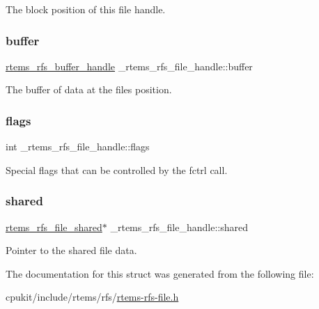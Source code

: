 The block position of this file handle. \mbox{\label{struct__rtems__rfs__file__handle_aaef16592d0b0c80d20b25affc231cc0f}} 
\subsubsection{\texorpdfstring{buffer}{buffer}}
{\footnotesize\ttfamily \mbox{\hyperlink{rtems-rfs-buffer_8h_a17f97c37c5273ad28d413dfd2d175e23}{rtems\+\_\+rfs\+\_\+buffer\+\_\+handle}} \+\_\+rtems\+\_\+rfs\+\_\+file\+\_\+handle\+::buffer}

The buffer of data at the file\textquotesingle{}s position. \mbox{\label{struct__rtems__rfs__file__handle_a445c19e3d76da08510851cf726ac1af5}} 
\subsubsection{\texorpdfstring{flags}{flags}}
{\footnotesize\ttfamily int \+\_\+rtems\+\_\+rfs\+\_\+file\+\_\+handle\+::flags}

Special flags that can be controlled by the fctrl call. \mbox{\label{struct__rtems__rfs__file__handle_a7bd82aa3d31f2d8127df58472a18655f}} 
\subsubsection{\texorpdfstring{shared}{shared}}
{\footnotesize\ttfamily \mbox{\hyperlink{rtems-rfs-file_8h_adb93e0b8dc15817a098cb105949cc3c7}{rtems\+\_\+rfs\+\_\+file\+\_\+shared}}$\ast$ \+\_\+rtems\+\_\+rfs\+\_\+file\+\_\+handle\+::shared}

Pointer to the shared file data. 

The documentation for this struct was generated from the following file\+:\begin{DoxyCompactItemize}
\item 
cpukit/include/rtems/rfs/\mbox{\hyperlink{rtems-rfs-file_8h}{rtems-\/rfs-\/file.\+h}}\end{DoxyCompactItemize}
